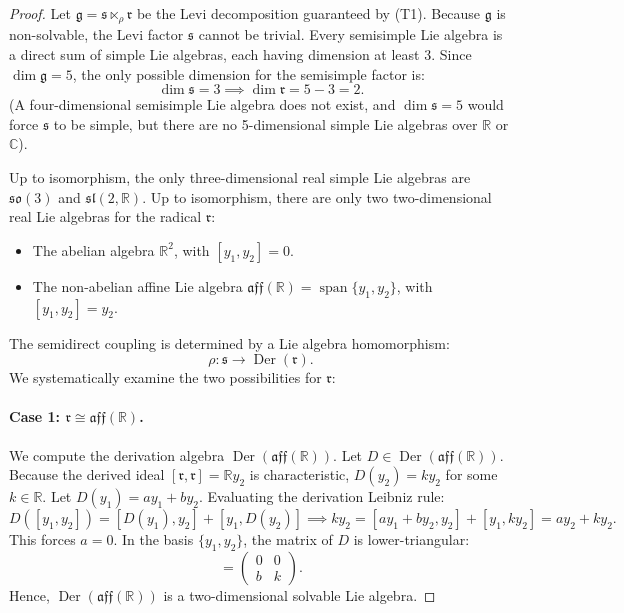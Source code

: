 \documentclass[11pt,a4paper]{article}
\theoremstyle{definition}
\theoremstyle{remark}
\newcommand{\R}{\mathbb{R}}
\newcommand{\C}{\mathbb{C}}
\newcommand{\g}{\mathfrak{g}}
\newcommand{\s}{\mathfrak{s}}
\newcommand{\rr}{\mathfrak{r}}
\newcommand{\Der}{\operatorname{Der}}
\newcommand{\spanop}{\operatorname{span}}
\begin{document}
\begin{proof}
Let $\g = \s \ltimes_\rho \rr$ be the Levi decomposition guaranteed by (T1). Because $\g$ is non-solvable, the Levi factor $\s$ cannot be trivial. Every semisimple Lie algebra is a direct sum of simple Lie algebras, each having dimension at least 3. Since $\dim \g = 5$, the only possible dimension for the semisimple factor is:
\begin{equation}
    \dim \s = 3 \implies \dim \rr = 5 - 3 = 2.
\end{equation}
(A four-dimensional semisimple Lie algebra does not exist, and $\dim \s = 5$ would force $\s$ to be simple, but there are no 5-dimensional simple Lie algebras over $\R$ or $\C$).

Up to isomorphism, the only three-dimensional real simple Lie algebras are $\mathfrak{so}(3)$ and $\mathfrak{sl}(2,\R)$. Up to isomorphism, there are only two two-dimensional real Lie algebras for the radical $\rr$:
\begin{itemize}
    \item The abelian algebra $\R^2$, with $[y_1, y_2] = 0$.
    \item The non-abelian affine Lie algebra $\mathfrak{aff}(\R) = \spanop\{y_1, y_2\}$, with $[y_1, y_2] = y_2$.
\end{itemize}

The semidirect coupling is determined by a Lie algebra homomorphism:
\begin{equation}
    \rho \colon \s \to \Der(\rr).
\end{equation}
We systematically examine the two possibilities for $\rr$:

\paragraph{Case 1: $\rr \cong \mathfrak{aff}(\R)$.}
We compute the derivation algebra $\Der(\mathfrak{aff}(\R))$. Let $D \in \Der(\mathfrak{aff}(\R))$. Because the derived ideal $[\rr, \rr] = \R y_2$ is characteristic, $D(y_2) = k y_2$ for some $k \in \R$. Let $D(y_1) = a y_1 + b y_2$. Evaluating the derivation Leibniz rule:
\begin{equation}
    D([y_1, y_2]) = [D(y_1), y_2] + [y_1, D(y_2)] \implies k y_2 = [a y_1 + b y_2, y_2] + [y_1, k y_2] = a y_2 + k y_2.
\end{equation}
This forces $a = 0$. In the basis $\{y_1, y_2\}$, the matrix of $D$ is lower-triangular:
\begin{equation}
    [D] = \begin{pmatrix} 0 & 0 \\ b & k \end{pmatrix}.
\end{equation}
Hence, $\Der(\mathfrak{aff}(\R))$ is a two-dimensional solvable Lie algebra. 


\end{proof}
\end{document}
